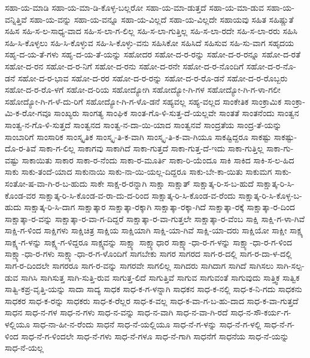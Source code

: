 {ಸಹಾ-ಯ-ಮಾಡಿ
ಸಹಾ-ಯ-ಮಾ-ಡಿ-ಕೊಳ್ಳ-ಬಲ್ಲರೋ
ಸಹಾ-ಯ-ಮಾ-ಡುತ್ತದೆ
ಸಹಾ-ಯ-ಮಾ-ಡುವ
ಸಹಾ-ಯ-ವನ್ನಿತ್ತಿವೆ
ಸಹಾ-ಯ-ವನ್ನು
ಸಹಾ-ಯ-ವನ್ನೂ
ಸಹಾ-ಯ-ವಿಲ್ಲದೆ
ಸಹಾ-ಯ-ವಿಲ್ಲದೇ
ಸಹಾಯವು
ಸಹಿತ
ಸಹಿಷ್ಣುತೆ
ಸಹಿಸ
ಸಹಿ-ಸ-ಲ-ಸಾಧ್ಯ-ವಾದ
ಸಹಿ-ಸ-ಲಾ-ಗ-ಲಿಲ್ಲ
ಸಹಿ-ಸ-ಲಾ-ಗುತ್ತಿಲ್ಲ
ಸಹಿ-ಸ-ಲಾ-ರದೇ
ಸಹಿ-ಸ-ಲಾ-ರರು
ಸಹಿಸಿ
ಸಹಿ-ಸಿ-ಕೊಳ್ಳಲು
ಸಹಿ-ಸಿ-ಕೊಳ್ಳುವ
ಸಹಿ-ಸಿ-ಕೊಳ್ಳು-ವನು
ಸಹಿಸಿಕೋ
ಸಹಿಸಿದೆ
ಸಹಿಸುವ
ಸಹಿ-ಸು-ವಾಗ
ಸಹೃದಯ
ಸಹೃ-ದ-ಯ-ತೆ-ಗಳು
ಸಹೃ-ದ-ಯ-ತೆ-ಯನ್ನು
ಸಹೋದರ
ಸಹೋ-ದ-ರ-ರನ್ನು
ಸಹೋ-ದ-ರ-ರನ್ನೂ
ಸಹೋ-ದ-ರತೆ
ಸಹೋ-ದ-ರನ
ಸಹೋ-ದ-ರ-ನಿಗೆ
ಸಹೋ-ದ-ರನು
ಸಹೋ-ದ-ರನೇ
ಸಹೋ-ದ-ರ-ನೊಂದಿಗೆ
ಸಹೋ-ದ-ರ-ನೊ-ಡನೆ
ಸಹೋ-ದ-ರ-ಭಾವ
ಸಹೋ-ದ-ರರ
ಸಹೋ-ದ-ರ-ರನ್ನು
ಸಹೋ-ದ-ರ-ರೊ-ಡನೆ
ಸಹೋ-ದ-ರ-ರೊಬ್ಬರು
ಸಹೋ-ದ-ರ-ರೊ-ಳಗೆ
ಸಹೋ-ದ-ರಿಯ
ಸಹೋದ್ಯೋಗಿ
ಸಹೋದ್ಯೋ-ಗಿ-ಗಳ
ಸಹೋದ್ಯೋ-ಗಿ-ಗ-ಳಾ-ಗಲೀ
ಸಹೋದ್ಯೋ-ಗಿ-ಗ-ಳೆ-ದು-ರಿಗೆ
ಸಹೋದ್ಯೋ-ಗಿ-ಗ-ಳೊ-ಡನೆ
ಸಹ್ಯವಲ್ಲ
ಸಹ್ಯ-ವಲ್ಲದ
ಸಾಂಕೇತಿಕ
ಸಾಂಕ್ರಾಮಿಕ
ಸಾಂಕ್ರಾ-ಮಿ-ಕ-ರೋ-ಗವೂ
ಸಾಂಖ್ಯರು
ಸಾಂಗತ್ಯ
ಸಾಂಘಿಕ
ಸಾಂತ-ಗೊ-ಳಿ-ಸುತ್ತ-ದೆ-ಯಲ್ಲವೇ
ಸಾಂತತೆ
ಸಾಂತನೆಂದು
ಸಾಂತ್ವನ
ಸಾಂತ್ವ-ನ-ಗೊ-ಳಿ-ಸುತ್ತದೆ
ಸಾಂತ್ವನದ
ಸಾಂತ್ವ-ನ-ದಾ-ಯಿ-ಯಾದ
ಸಾಂತ್ವನವೆ
ಸಾಂದ್ರತೆಯ
ಸಾಂದ್ರ-ತೆ-ಯನ್ನು
ಸಾಂಬಾರಿಗೆ
ಸಾಂಸಾರಿಕ
ಸಾಂಸ್ಕೃತಿಕ
ಸಾಂಸ್ಕೃ-ತಿ-ಕ-ವಾಗಿ
ಸಾಂಸ್ಕೃ-ತಿ-ಕ-ವಾ-ಗಿಯೂ
ಸಾಕಷ್ಟಿದ್ದರೂ
ಸಾಕಷ್ಟು
ಸಾಕಷ್ಟು-ದೊ-ರ-ತಿವೆ
ಸಾಕಾ-ಗ-ಲಿಲ್ಲ
ಸಾಕಾಗವು
ಸಾಕಾಗಿದೆ
ಸಾಕಾ-ಗುತ್ತದೆ
ಸಾಕಾ-ಗುತ್ತ-ದೆ-ಇದು
ಸಾಕಾ-ಗುತ್ತಿಲ್ಲ
ಸಾಕಾ-ಗು-ವಷ್ಟು
ಸಾಕಾಯಿತು
ಸಾಕಾರ
ಸಾಕಾ-ರ-ನೆಂದು
ಸಾಕಾ-ರ-ಮೂರ್ತಿ
ಸಾಕಾ-ರಿ-ಯೆಂದೂ
ಸಾಕಿ
ಸಾಕಿದ
ಸಾಕಿ-ಸ-ಲ-ಹಿದ
ಸಾಕು
ಸಾಕು-ತಂದೆ-ಯಾದ
ಸಾಕುನಾಯಿ
ಸಾಕು-ನಾ-ಯಿ-ಯಲ್ಲ-ದಿದ್ದರೂ
ಸಾಕು-ಬೇ-ಕಾ-ಯಿತು
ಸಾಕುಮಗ
ಸಾಕು-ಸಂತೋ-ಷ-ವಾ-ಗಿ-ರ-ಬ-ಹುದು
ಸಾಕೇ
ಸಾಕ್ಷ-ರ-ರನ್ನಾಗಿ
ಸಾಕ್ಷಾ
ಸಾಕ್ಷಾತ್
ಸಾಕ್ಷಾತ್ಕ-ರಿ-ಸ-ಬ-ಹುದೆ
ಸಾಕ್ಷಾತ್ಕ-ರಿ-ಸಿ-ಕೊಂಡ-ವರ
ಸಾಕ್ಷಾತ್ಕ-ರಿ-ಸಿ-ಕೊಂಡ-ವ-ರಾ-ದು-ದ-ರಿಂದ
ಸಾಕ್ಷಾತ್ಕ-ರಿ-ಸಿ-ಕೊಂಡ-ವ-ರೆಂದು
ಸಾಕ್ಷಾತ್ಕ-ರಿ-ಸಿ-ಕೊಳ್ಳ-ಬ-ಹುದು
ಸಾಕ್ಷಾತ್ಕ-ರಿ-ಸಿ-ದಾಗ
ಸಾಕ್ಷಾತ್ಕಾರ
ಸಾಕ್ಷಾತ್ಕಾ-ರಕ್ಕಾಗಿ
ಸಾಕ್ಷಾತ್ಕಾ-ರಕ್ಕಾ-ಗಿದೆ
ಸಾಕ್ಷಾತ್ಕಾ-ರಕ್ಕೆ
ಸಾಕ್ಷಾತ್ಕಾ-ರ-ದಿಂದ
ಸಾಕ್ಷಾತ್ಕಾ-ರ-ವನ್ನು
ಸಾಕ್ಷಾತ್ಕಾ-ರ-ವಾ-ಗ-ದಿದ್ದರೆ
ಸಾಕ್ಷಾತ್ಕಾ-ರ-ವಾ-ಗುತ್ತಲೇ
ಸಾಕ್ಷಾತ್ಕಾ-ರ-ವೆಂಬ
ಸಾಕ್ಷಿ
ಸಾಕ್ಷಿ-ಗ-ಳಾ-ಗಿವೆ
ಸಾಕ್ಷಿ-ಗ-ಳಿಂದ
ಸಾಕ್ಷಿಗಳು
ಸಾಕ್ಷಿಚಿತ್ರ
ಸಾಕ್ಷಿಯ
ಸಾಕ್ಷಿಯಾಗಿ
ಸಾಕ್ಷಿ-ಯಾ-ಗಿವೆ
ಸಾಕ್ಷಿ-ಯಾ-ದರು
ಸಾಕ್ಷಿಯೋ
ಸಾಕ್ಷೀ
ಸಾಕ್ಷ್ಯ
ಸಾಕ್ಷ್ಯ-ಗ-ಳನ್ನು
ಸಾಕ್ಷ್ಯ-ಗ-ಳಿದ್ದರೂ
ಸಾಕ್ಷ್ಯವನ್ನು
ಸಾಕ್ಷ್ಯಾ
ಸಾಕ್ಷ್ಯಾಧಾರ
ಸಾಕ್ಷ್ಯಾ-ಧಾ-ರ-ಗ-ಳನ್ನು
ಸಾಕ್ಷ್ಯಾ-ಧಾ-ರ-ಗ-ಳಿಂದ
ಸಾಕ್ಷ್ಯಾ-ಧಾ-ರ-ಗಳು
ಸಾಕ್ಷ್ಯಾ-ಧಾ-ರ-ಗ-ಳೊಂದಿಗೆ
ಸಾಗಬೇಕು
ಸಾಗರ
ಸಾಗರದ
ಸಾಗ-ರ-ದಲ್ಲಿ
ಸಾಗ-ರ-ದಾ-ಳ-ದಲ್ಲಿ
ಸಾಗ-ರ-ದಿಂದಲೇ
ಸಾಗರರೂ
ಸಾಗ-ರ-ವನ್ನು
ಸಾಗರವೇ
ಸಾಗಲಿಲ್ಲ
ಸಾಗಿದರು
ಸಾಗಿದಾಗ
ಸಾಗಿದೆ
ಸಾಗಿಸಲು
ಸಾಗಿ-ಸಲ್ಪ-ಡುವ
ಸಾಗಿಸಿ
ಸಾಗಿಸುತ್ತ
ಸಾಗಿ-ಸುತ್ತಿ-ರುವ
ಸಾಗುತ್ತ-ಲಿದೆ
ಸಾಗುತ್ತಿವೆ
ಸಾಗುವ
ಸಾಗುವಂತೆ
ಸಾಗುವುದು
ಸಾತ್ತ್ವಿಕ
ಸಾತ್ವಿಕ
ಸಾತ್ವಿ-ಕಪ್ರ-ವೃತ್ತಿ-ಯನ್ನು
ಸಾದಾ
ಸಾದ್ಯ
ಸಾಧಕ
ಸಾಧ-ಕ-ಗ-ಳನ್ನಾಗಿ
ಸಾಧಕನ
ಸಾಧ-ಕ-ನಲ್ಲಿ
ಸಾಧ-ಕ-ನಿ-ಗದು
ಸಾಧಕನು
ಸಾಧಕರ
ಸಾಧ-ಕ-ರನ್ನು
ಸಾಧಕರು
ಸಾಧ-ಕ-ರೆಲ್ಲರ
ಸಾಧ-ಕ-ವಲ್ಲ
ಸಾಧ-ಕ-ವಾ-ಗ-ಬ-ಹು-ದಾದ
ಸಾಧ-ಕ-ವಾ-ಗುತ್ತದೆ
ಸಾಧನ
ಸಾಧ-ನ-ಗಳ
ಸಾಧ-ನ-ಗಳು
ಸಾಧ-ನ-ವನ್ನು
ಸಾಧ-ನ-ವಾಗಿ
ಸಾಧ-ನ-ವಾ-ಗಿ-ರದೆ
ಸಾಧ-ನ-ಸೌ-ಕರ್ಯ-ಗ-ಳಲ್ಲಿಯೂ
ಸಾಧ-ನಾ-ಹೀ-ನ-ರೆಂದು
ಸಾಧನೆ
ಸಾಧ-ನೆ-ಯಲ್ಲಿಯೂ
ಸಾಧ-ನೆ-ಗ-ಳನ್ನು
ಸಾಧ-ನೆ-ಗ-ಳಲ್ಲಿ
ಸಾಧ-ನೆ-ಗ-ಳಿಂದ
ಸಾಧ-ನೆ-ಗ-ಳಿಂದಲೇ
ಸಾಧ-ನೆ-ಗಳು
ಸಾಧ-ನೆ-ಗಳೂ
ಸಾಧ-ನೆ-ಗಾಗಿ
ಸಾಧನೆಗೆ
ಸಾಧನೆಯ
ಸಾಧ-ನೆ-ಯನ್ನು
ಸಾಧ-ನೆ-ಯಲ್ಲ
}
